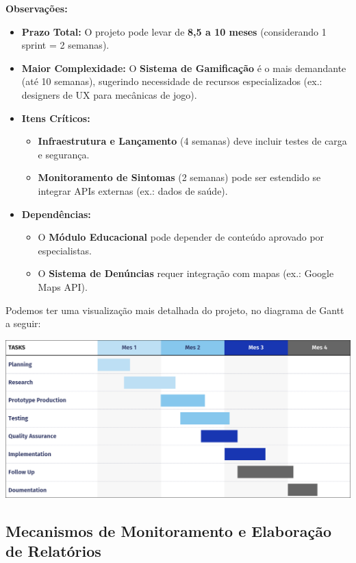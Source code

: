 \documentclass[a4paper, 12pt]{article}
\begin{document}
\noindent \textbf{Observações:}
\begin{itemize}
    \item \textbf{Prazo Total:} O projeto pode levar de \textbf{8,5 a 10 meses} (considerando 1 sprint = 2 semanas).
    \item \textbf{Maior Complexidade:} O \textbf{Sistema de Gamificação} é o mais demandante (até 10 semanas), sugerindo necessidade de recursos especializados (ex.: designers de UX para mecânicas de jogo).
    \item \textbf{Itens Críticos:} 
    \begin{itemize}
        \item \textbf{Infraestrutura e Lançamento} (4 semanas) deve incluir testes de carga e segurança.
        \item \textbf{Monitoramento de Sintomas} (2 semanas) pode ser estendido se integrar APIs externas (ex.: dados de saúde).
    \end{itemize}
    \item \textbf{Dependências:} 
    \begin{itemize}
        \item O \textbf{Módulo Educacional} pode depender de conteúdo aprovado por especialistas.
        \item O \textbf{Sistema de Denúncias} requer integração com mapas (ex.: Google Maps API).
    \end{itemize}
\end{itemize}

Podemos ter uma visualização mais detalhada do projeto, no diagrama de Gantt a seguir:

\begin{center}
\includegraphics[width=\textwidth,keepaspectratio]{2025-04-18_16-03-51_screenshot.png}
\end{center}


\subsection{Mecanismos de Monitoramento e Elaboração de Relatórios}
\end{document}
